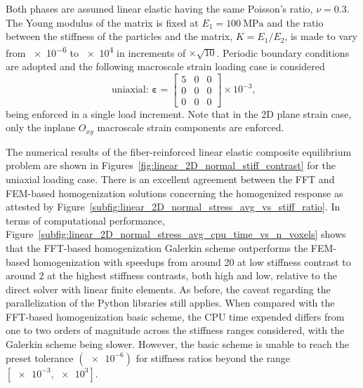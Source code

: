 Both phases are assumed linear elastic having the same Poisson's ratio, \(\nu=0.3\).
The Young modulus of the matrix is fixed at \(E_1=\SI{100}{\mega\pascal}\) and the ratio between the stiffness of the particles and the matrix, \(K=E_1/E_2\), is made to vary from \num{e-6} to \num{e4} in increments of \(\times \sqrt{10}\).
Periodic boundary conditions are adopted and the following macroscale strain loading case is considered
\begin{equation}
\text { uniaxial: } \bm{\varepsilon}=\left[\begin{array}{lll}
5 & 0 & 0 \\
0 & 0 & 0 \\
0 & 0 & 0
\end{array}\right] \times 10^{-3},
\end{equation}
being enforced in a single load increment.
Note that in the 2D plane strain case, only the inplane \(O_{x y}\) macroscale strain components are enforced.

The numerical results of the fiber-reinforced linear elastic composite equilibrium problem are shown in Figures~\ref{fig:linear_2D_normal_stiff_contrast} for the uniaxial loading case.
There is an excellent agreement between the FFT and FEM-based homogenization solutions concerning the homogenized response as attested by Figure~\ref{subfig:linear_2D_normal_stress_avg_vs_stiff_ratio}.
In terms of computational performance, Figure~\ref{subfig:linear_2D_normal_stress_avg_cpu_time_vs_n_voxels} shows that the FFT-based homogenization Galerkin scheme outperforms the FEM-based homogenization with speedups from around 20 at low stiffness contrast to around 2 at the highest stiffness contrasts, both high and low, relative to the direct solver with linear finite elements.
As before, the caveat regarding the parallelization of the Python libraries still applies.
When compared with the FFT-based homogenization basic scheme, the CPU time expended differs from one to two orders of magnitude across the stiffness ranges considered, with the Galerkin scheme being slower.
However, the basic scheme is unable to reach the preset tolerance \((\num{e-6})\) for stiffness ratios beyond the range \([\num{e-3},\num{e3}]\).

